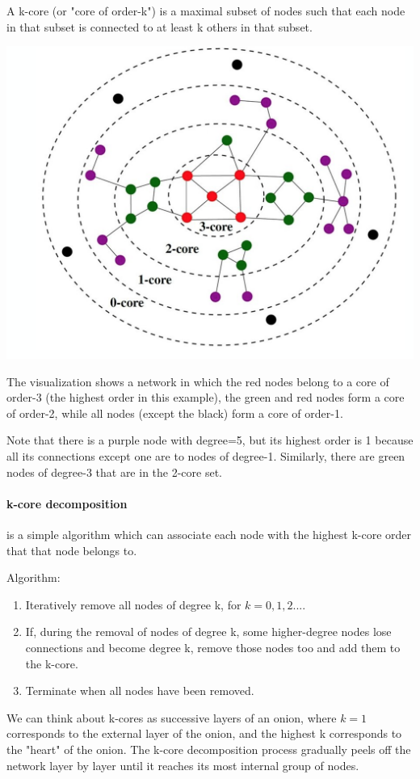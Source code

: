 \documentclass[11pt]{scrartcl} %
\begin{document}
A k-core (or "core of order-k") is a maximal subset of nodes such that each node in that subset is connected to at least k others in that subset.

\begin{center}
	\includegraphics[width=0.75\linewidth]{img/L6.1-kCoreDecomposition.PNG}
\end{center}
The visualization shows a network in which the red nodes belong to a core of order-3 (the highest order in this example), the green and red nodes form a core of order-2,  while all nodes (except the black) form a core of order-1.

Note that there is a purple node with degree=5, but its highest order is 1 because all its connections except one are to nodes of degree-1. Similarly, there are green nodes of degree-3 that are in the 2-core set.

\paragraph{k-core decomposition} is a simple algorithm which can associate each node with the highest k-core order that that node belongs to.

Algorithm:
\begin{enumerate}
	\item Iteratively remove all nodes of degree k, for $k=0, 1, 2...$.
	\item If, during the removal of nodes of degree k, some higher-degree nodes lose connections and become degree k, remove those nodes too and add them to the k-core.
	\item Terminate when all nodes have been removed.
\end{enumerate}

We can think about k-cores as successive layers of an onion, where $k=1$ corresponds to the external layer of the onion, and the highest k corresponds to the "heart" of the onion. The k-core decomposition process gradually peels off the network layer by layer until it reaches its most internal group of nodes.
\end{document}
